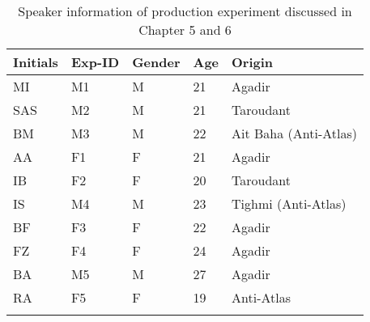 \begin{table} 
\caption{Speaker information of production experiment discussed in Chapter 5 and 6}
\label{Table A2}
\begin{tabular}{lllll}
\lsptoprule
\textbf{Initials}                              & \textbf{Exp-ID} & \textbf{Gender} & \textbf{Age} & \textbf{Origin}                \\
\midrule
MI                                    & M1     & M      & 21  & Agadir                \\
SAS                                   & M2     & M      & 21  & Taroudant             \\
BM                                    & M3     & M      & 22  & Ait Baha (Anti-Atlas) \\
AA                                    & F1     & F      & 21  & Agadir                \\
IB                                    & F2     & F      & 20  & Taroudant             \\
IS                                    & M4     & M      & 23  & Tighmi (Anti-Atlas)   \\
BF                                    & F3     & F      & 22  & Agadir                \\
FZ                                    & F4     & F      & 24  & Agadir                \\
BA                                    & M5     & M      & 27  & Agadir                \\
RA                                    & F5     & F      & 19  & Anti-Atlas         \\  
\lspbottomrule
\end{tabular}
\end{table}

